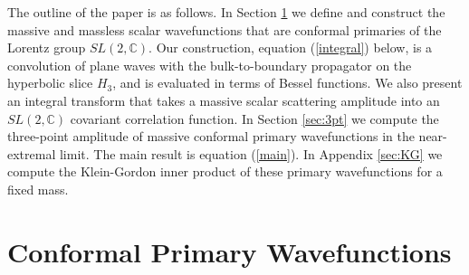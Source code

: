 \documentclass[12pt]{article}
\numberwithin{equation}{section}
\begin{document}
The outline of the paper is as follows. In Section \ref{sec:wavefunction} we define and construct the massive and massless scalar wavefunctions that are conformal primaries of the Lorentz group $SL(2,\mathbb{C})$. Our construction, equation (\ref{integral}) below, is a convolution of plane waves with the bulk-to-boundary propagator on the hyperbolic slice $H_3$, and is evaluated in terms of Bessel functions. We also present an integral transform  that takes a massive scalar scattering amplitude into an $SL(2,\mathbb{C})$ covariant correlation function. In Section \ref{sec:3pt} we compute the  three-point amplitude  of massive conformal primary wavefunctions in the near-extremal limit.  The main result is equation (\ref{main}). In Appendix  \ref{sec:KG} we compute the Klein-Gordon inner product of these primary wavefunctions for a fixed mass.  



\section{Conformal Primary Wavefunctions}\label{sec:wavefunction}
\end{document}
